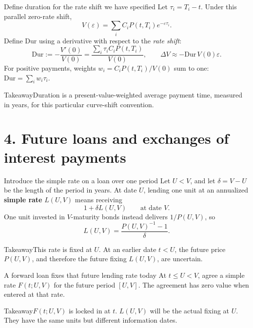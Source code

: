 \documentclass[handout,10pt,t,aspectratio=169]{beamer}
\newenvironment{keybox}{\begin{exampleblock}{Takeaway}}{\end{exampleblock}}
\begin{document}
\begin{frame}{Define duration for the rate shift we have specified}
\small
Let \(\tau_i=T_i-t\). Under this parallel zero-rate shift,
\[
 V(\varepsilon)=\sum_i C_iP(t,T_i)e^{-\varepsilon\tau_i}.
\]
Define \(\mathrm{Dur}\) using a derivative with respect to the \emph{rate shift}:
\[
 \boxed{\mathrm{Dur}:=-\frac{V'(0)}{V(0)}
 =\frac{\sum_i\tau_i C_iP(t,T_i)}{V(0)},\qquad
 \Delta V\approx-\mathrm{Dur}\,V(0)\varepsilon.}
\]
For positive payments, weights \(w_i=C_iP(t,T_i)/V(0)\) sum to one:
\(\mathrm{Dur}=\sum_iw_i\tau_i\).
\begin{keybox}Duration is a present-value-weighted average payment time,
measured in years, for this particular curve-shift convention.\end{keybox}
\end{frame}

\section{4. Future loans and exchanges of interest payments}

\begin{frame}{Introduce the simple rate on a loan over one period}
Let \(U<V\), and let \(\delta=V-U\) be the length of the period in years.
At date \(U\), lending one unit at an annualized \textbf{simple rate}
\(L(U,V)\) means receiving
\[
 1+\delta L(U,V)\qquad\text{at date }V.
\]
One unit invested in \(V\)-maturity bonds instead delivers \(1/P(U,V)\), so
\[
 \boxed{L(U,V)=\frac{P(U,V)^{-1}-1}{\delta}.}
\]
\begin{keybox}This rate is fixed at \(U\). At an earlier date \(t<U\),
the future price \(P(U,V)\), and therefore the future fixing \(L(U,V)\), are uncertain.\end{keybox}
\end{frame}

\begin{frame}{A forward loan fixes that future lending rate today}
At \(t\leq U<V\), agree a simple rate \(F(t;U,V)\) for the future period \([U,V]\).
The agreement has zero value when entered at that rate.
\begin{center}\end{center}
\begin{keybox}\(F(t;U,V)\) is locked in at \(t\).
\(L(U,V)\) will be the actual fixing at \(U\). They have the same units but different information dates.\end{keybox}
\end{frame}
\end{document}
